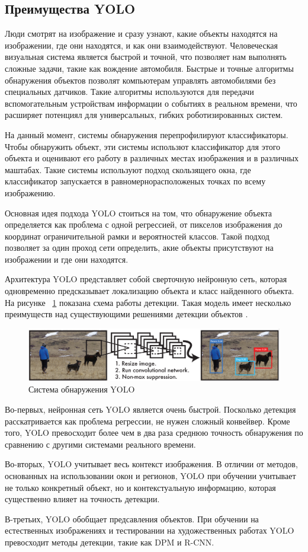 \documentclass[a4paper,english,russian]{G2-105}
\begin{document}
\subsection{Преимущества YOLO}
\par Люди смотрят на изображение и сразу узнают, какие объекты находятся на изображении, где они находятся, и как они взаимодействуют. Человеческая визуальная система является быстрой и точной, что позволяет нам выполнять сложные задачи, такие как вождение автомобиля. Быстрые и точные алгоритмы обнаружения объектов позволят компьютерам управлять автомобилями без специальных датчиков. Такие алгоритмы используются для передачи вспомогательным устройствам информации о событиях в реальном времени, что расширяет потенциял для универсальных, гибких роботизированных систем.
\par На данный момент, системы обнаружения перепрофилируют классификаторы. Чтобы обнаружить объект, эти системы использют классификатор для этого объекта и оценивают его работу в различных местах изображения и в различных маштабах. Такие системы используют подход скользящего окна, где классификатор запускается в равномернорасположеных точках по всему изображению.
\par Основная идея подхода YOLO стоиться на том, что обнаружение объекта определяется как проблема с одной регрессией, от пикселов изображения до координат ограничительной рамки и вероятностей классов. Такой подход позволяет за один проход сети определить, акие объекты присутствуют на изображении и где они находятся.
\par Архитектура YOLO представляет собой сверточную нейронную сеть, которая одновременно предсказывает локализацию объекта и класс найденного объекта. На рисунке ~\ref{yolo} показана схема работы детекции. Такая модель имеет несколько преимуществ над существующими решениями детекции объектов \cite{17}.
\begin{figure}
    \includegraphics[width=\linewidth]{yolo.png}
    \caption{Система обнаружения YOLO}
	\label{yolo}
\end{figure}
\par Во-первых, нейронная сеть YOLO является очень быстрой. Посколько детекция расскатривается как проблема регрессии, не нужен сложный конвейвер. Кроме того, YOLO превосходит более чем в два раза среднюю точность обнаружения по сравнению с другими системами реального времени.
\par Во-вторых, YOLO учитывает весь контекст изображения. В отличии от методов, основанных на использовании окон и регионов, YOLO при обучении учитывает не только конкретный объект, но и контекстуальную информацию, которая существенно влияет на точность детекции. 
\par В-третьих, YOLO обобщает предсавления объектов. При обучении на естественных изображениях и тестировании на художественных работах YOLO превосходит методы детекции, такие как DPM и R-CNN.
\ttl
\end{document}
